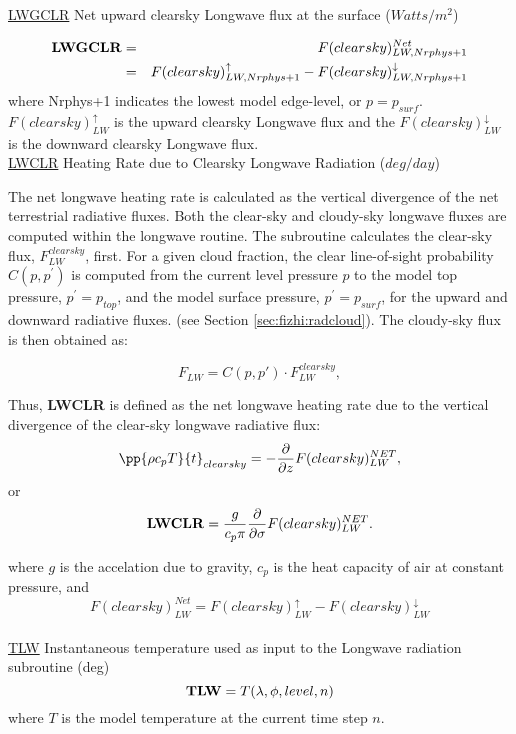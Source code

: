 \noindent
{ \underline {LWGCLR} Net upward clearsky Longwave flux at the surface ($Watts/m^2$) }

\noindent
\begin{eqnarray*}
{\bf LWGCLR} & =  & F(clearsky)_{LW,Nrphys+1}^{Net} \\
             & =  & F(clearsky)_{LW,Nrphys+1}^\uparrow - F(clearsky)_{LW,Nrphys+1}^\downarrow
\end{eqnarray*}
where Nrphys+1 indicates the lowest model edge-level, or $p = p_{surf}$.
$F(clearsky)_{LW}^\uparrow$ is
the upward clearsky Longwave flux and the $F(clearsky)_{LW}^\downarrow$ is the downward clearsky Longwave flux.
\\

\noindent
{ \underline {LWCLR} Heating Rate due to Clearsky Longwave Radiation ($deg/day$) }

\noindent
The net longwave heating rate is calculated as the vertical divergence of the
net terrestrial radiative fluxes.
Both the clear-sky and cloudy-sky longwave fluxes are computed within the
longwave routine.
The subroutine calculates the clear-sky flux, $F^{clearsky}_{LW}$, first.
For a given cloud fraction,
the clear line-of-sight probability $C(p,p^{\prime})$ is computed from the current level pressure $p$ 
to the model top pressure, $p^{\prime} = p_{top}$, and the model surface pressure, $p^{\prime} = p_{surf}$,
for the upward and downward radiative fluxes.
(see Section \ref{sec:fizhi:radcloud}).
The cloudy-sky flux is then obtained as:
   
\noindent
\[
F_{LW} = C(p,p') \cdot F^{clearsky}_{LW},
\]

\noindent
Thus, {\bf LWCLR} is defined as the net longwave heating rate due to the 
vertical divergence of the
clear-sky longwave radiative flux:
\[
\pp{\rho c_p T}{t}_{clearsky} = - {\partial \over \partial z} F(clearsky)_{LW}^{NET} ,
\]
or
\[
{\bf LWCLR} = \frac{g}{c_p \pi} {\partial \over \partial \sigma} F(clearsky)_{LW}^{NET} .
\]

\noindent
where $g$ is the accelation due to gravity,
$c_p$ is the heat capacity of air at constant pressure,
and
\[
F(clearsky)_{LW}^{Net} = F(clearsky)_{LW}^\uparrow - F(clearsky)_{LW}^\downarrow
\]
\\

 
\noindent
{ \underline {TLW} Instantaneous temperature used as input to the Longwave
 radiation subroutine (deg)}
\[
{\bf TLW}  = T(\lambda , \phi ,level, n)
\]
\noindent
where $T$ is the model temperature at the current time step $n$.
\\
 
